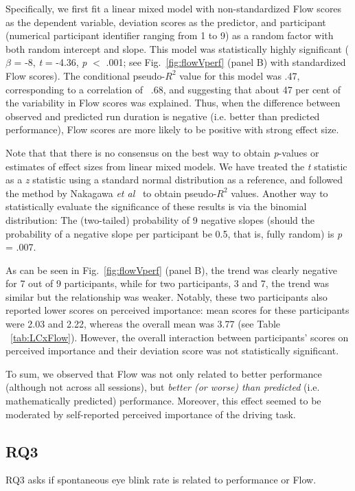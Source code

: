 \documentclass[fleqn,10pt]{wlscirep}
\begin{document}
Specifically, we first fit a linear mixed model with non-standardized Flow scores as the dependent variable, deviation scores as the predictor, and participant (numerical participant identifier ranging from 1 to 9) as a random factor with both random intercept and slope. This model was statistically highly significant ($\beta$ = -8, {\it t} = -4.36, {\it p} $<$ .001; see Fig.~\ref{fig:flowVperf} (panel B) with standardized Flow scores). The conditional pseudo-$R^2$ value for this model was .47, corresponding to a correlation of ~.68, and suggesting that about 47 per cent of the variability in Flow scores was explained. Thus, when the difference between observed and predicted run duration is negative (i.e. better than predicted performance), Flow scores are more likely to be positive with strong effect size.

Note that that there is no consensus on the best way to obtain {\it p}-values or estimates of effect sizes from linear mixed models. We have treated the {\it t} statistic as a {\it z} statistic using a standard normal distribution as a reference, and followed the method by Nakagawa {\it et al}~\cite{nakagawa2013general} to obtain pseudo-$R^2$ values. Another way to statistically evaluate the significance of these results is via the binomial distribution: The (two-tailed) probability of 9 negative slopes (should the probability of a negative slope per participant be 0.5, that is, fully random) is {\it p} = .007.

As can be seen in Fig.~\ref{fig:flowVperf} (panel B), the trend was clearly negative for 7 out of 9 participants, while for two participants, 3 and 7, the trend was similar but the relationship was weaker. Notably, these two participants also reported lower scores on perceived importance: mean scores for these participants were 2.03 and 2.22, whereas the overall mean was 3.77 (see Table ~\ref{tab:LCxFlow}). However, the overall interaction between participants’ scores on perceived importance and their deviation score was not statistically significant.

To sum, we observed that Flow was not only related to better performance (although not across all sessions), but {\it better (or worse) than predicted} (i.e. mathematically predicted) performance. Moreover, this effect seemed to be moderated by self-reported perceived importance of the driving task.


\subsection*{RQ3}
{\sf RQ3} asks if spontaneous eye blink rate is related to performance or Flow.
\end{document}
